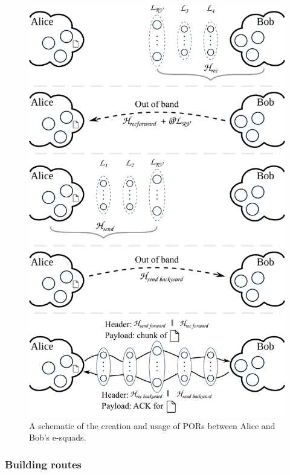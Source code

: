 \begin{figure}[t]
  \includegraphics[width=\linewidth]{figures/file_exchange.pdf}
  \caption{\label{fig:file-exchange}A schematic of the creation and usage of PORs between Alice and Bob's e-squads.}
\end{figure}

\subsubsection{Building routes} 
\label{ssub:building_routes}


